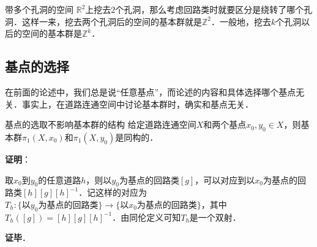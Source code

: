 \begin{example}{带多个孔洞的空间}
$\mathbb{R}^2$上挖去$2$个孔洞，那么考虑回路类时就要区分是绕转了哪个孔洞．这样一来，挖去两个孔洞后的空间的基本群就是$\mathbb{Z}^2$．一般地，挖去$k$个孔洞以后的空间的基本群是$\mathbb{Z}^k$．
\end{example}

\subsection{基点的选择}

在前面的论述中，我们总是说“任意基点”，而论述的内容和具体选择哪个基点无关．事实上，在道路连通空间中讨论基本群时，确实和基点无关．

\begin{theorem}{基点的选取不影响基本群的结构}
给定道路连通空间$X$和两个基点$x_0, y_0\in X$，则基本群$\pi_1(X, x_0)$和$\pi_1(X, y_0)$是同构的．
\end{theorem}

\textbf{证明}：

取$x_0$到$y_0$的任意道路$h$，则以$y_0$为基点的回路类$[g]$，可以对应到以$x_0$为基点的回路类$[h][g][h]^{-1}$．记这样的对应为$T_h: \{以y_0为基点的回路类\}\rightarrow\{以x_0为基点的回路类\}$，其中$T_h([g])=[h][g][h]^{-1}$．由同伦定义可知$T_h$是一个双射．



\textbf{证毕}．



